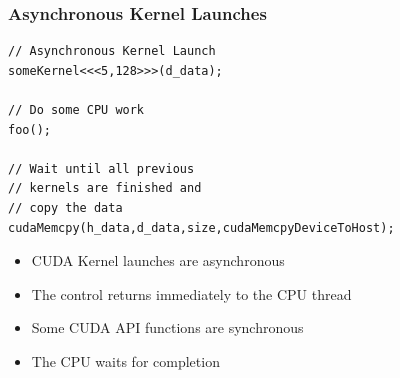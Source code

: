 \documentclass[aspectratio=169,handout]{beamer}
\begin{document}
\begin{frame}[fragile]
	\frametitle{Asynchronous Kernel Launches}
	\begin{minipage}{0.45\linewidth}
\begin{lstlisting}
// Asynchronous Kernel Launch
someKernel<<<5,128>>>(d_data);

// Do some CPU work
foo();

// Wait until all previous 
// kernels are finished and 
// copy the data
cudaMemcpy(h_data,d_data,size,cudaMemcpyDeviceToHost);
\end{lstlisting}
	\end{minipage}
	\begin{minipage}{0.5\linewidth}
\begin{itemize}
	\item<2-> CUDA Kernel launches are asynchronous
	\item<3->[$\rightarrow$] The control returns immediately to the CPU thread
	\item<4-> Some CUDA API functions are synchronous
	\item<5->[$\rightarrow$] The CPU waits for completion
\end{itemize}
	\end{minipage}
\end{frame}
\end{document}
